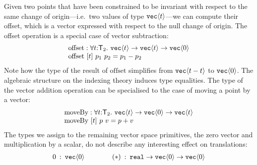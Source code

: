 Given two points that have been constrained to be invariant with
respect to the same change of origin---i.e.~two values of type
$\texttt{vec}\langle t \rangle$---we can compute their offset, which is a vector
expressed with respect to the null change of origin. The offset
operation is a special case of vector subtraction:
\begin{displaymath}
  \begin{array}{l}
    \mathrm{offset} : \forall t \mathord:\mathsf{T}_2.\ \texttt{vec}\langle t \rangle \to \texttt{vec}\langle t \rangle \to \texttt{vec}\langle 0 \rangle \\
    \mathrm{offset}\ [t]\ p_1\ p_2 = p_1 - p_2
  \end{array}
\end{displaymath}
Note how the type of the result of $\mathrm{offset}$ simplifies from
$\texttt{vec}\langle t-t \rangle$ to $\texttt{vec}\langle 0 \rangle$. The algebraic structure on
the indexing theory induces type equalities.  The type of the vector
addition operation can be specialised to the case of moving a point by
a vector:
\begin{displaymath}
  \begin{array}{l}
    \mathrm{moveBy} : \forall t \mathord:\mathsf{T}_2.\ \texttt{vec}\langle t \rangle \to \texttt{vec}\langle 0 \rangle \to \texttt{vec}\langle t \rangle \\
    \mathrm{moveBy}\ [t]\ p\ v = p + v
  \end{array}
\end{displaymath}
The types we assign to the remaining vector space primitives, the zero
vector and multiplication by a scalar, do not describe any interesting
effect on translations:
\begin{displaymath}
  \begin{array}{l@{\hspace{0.5em}:\hspace{0.5em}}l@{\hspace{4em}}l@{\hspace{0.5em}:\hspace{0.5em}}l}
    \mathrm{0} & \tyPrim{vec}{0}&
    (*) & \tyPrimNm{real} \to \tyPrim{vec}{0} \to \tyPrim{vec}{0}
  \end{array}
\end{displaymath}


